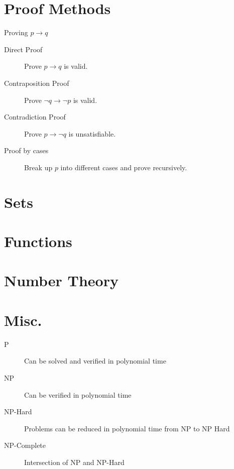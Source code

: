 \documentclass[a4paper]{article}
\begin{document}
\section{Proof Methods}
Proving $p \to q$
\begin{description}
    \item[Direct Proof] Prove $p \to q$ is valid.
    \item[Contraposition Proof] Prove $\neg q \to \neg p$ is valid.
    \item[Contradiction Proof] Prove $p \to \neg q$ is unsatisfiable.
    \item[Proof by cases] Break up $p$ into different cases and prove recursively.
\end{description}

\section{Sets}

\section{Functions}

\section{Number Theory}

\section{Misc.}
\begin{description}
    \item[P] Can be solved and verified in polynomial time
    \item[NP] Can be verified in polynomial time
    \item[NP-Hard] Problems can be reduced in polynomial time from NP to NP Hard
    \item[NP-Complete] Intersection of NP and NP-Hard
\end{description}
\end{document}
